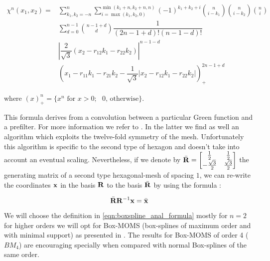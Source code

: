 \documentclass[11pt,a4paper]{amsart}
\begin{document}
\begin{align}
\label{eqn:boxspline_anal_formula}
\chi^n (x_1, x_2)  = &\sum_{k_1,k_2 = -n}^n \sum_{i =\max(k_1, k_2,0)}^{\min(k_1 + n, k_2 + n,n)} (-1)^ {k_1+k_2+i} \binom{n}{i-k_1}\binom{n}{i-k_2}\binom{n}{i} \nonumber \\  
&\sum_{d=0}^{n-1}  \binom{n-1+d}{d} \dfrac{1}{(2n-1+d)!(n-1-d)!} \nonumber \\
& \left| \dfrac{2}{\sqrt{3}} \left( x_2 - r_{12}k_1 -r_{22}k_2 \right) \right|^{n-1-d} \nonumber\\
& \left(x_1-r_{11}k_1 -r_{21}k_2 - \dfrac{1}{\sqrt{3}} \left| x_2 - r_{12}k_1 -r_{22}k_2 \right|\right)_+^{2n-1+d}
\end{align}

where $(x)^n_+ = \{ x^n \text{ for } x>0; \text{ } 0 \text{, otherwise}\}$.

This formula derives from a convolution between a particular Green function and a prefilter. For more information we refer to \cite{Condat2006}. In the latter we find as well an algorithm which exploits the twelve-fold symmetry of the mesh. Unfortunately this algorithm is specific to the second type of hexagon and doesn't take into account an eventual scaling. Nevertheless, if we denote by 
$\bar{\mathbf{R}} = \left[\begin{matrix}
\frac{1}{2}\\ 
-\frac{\sqrt{3}}{2}
\end{matrix}
\quad
\begin{matrix}
\frac{1}{2}\\ 
\frac{\sqrt{3}}{2}
\end{matrix}
\right]$
 the generating matrix of a second type hexagonal-mesh of spacing $1$, we can re-write the coordinates $\mathbf{x}$ in the basis $\mathbf{R}$ to the basis $\bar{\mathbf{R}}$ by using the formula : 

\begin{equation}
\label{eqn:change_basis}
\displaystyle \bar{\mathbf{R}}\mathbf{R}^{-1}\mathbf{x} = \bar{\mathbf{x}}
\end{equation} 

%




We will choose the definition in \eqref{eqn:boxspline_anal_formula} mostly for $n=2$ for higher orders we will opt for Box-MOMS (box-splines of maximum order and with minimal support) as presented in \cite{Condat2008}. The results for Box-MOMS of order 4 ($BM_4$) are encouraging specially when compared with normal Box-splines of the same order.
\end{document}
